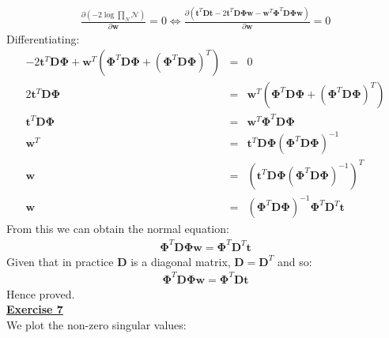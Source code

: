 \documentclass[a4paper, 11pt]{article}
\begin{document}
\begin{eqnarray}
\frac{\partial (-2 \log \prod_N \mathcal{N})}{\partial \mathbf{w}} = 0 \Leftrightarrow \frac{\partial \left( \mathbf{t}^T \mathbf{D} \mathbf{t} - 2 \mathbf{t}^T \mathbf{D} \mathbf{\Phi} \mathbf{w} - \mathbf{w}^T \mathbf{\Phi}^T \mathbf{D} \mathbf{\Phi} \mathbf{w} \right)}{\partial \mathbf{w}} = 0 \nonumber
\end{eqnarray}
Differentiating:
\begin{eqnarray}
-2 \mathbf{t}^T \mathbf{D} \mathbf{\Phi} + \mathbf{w}^T \left( \mathbf{\Phi}^T \mathbf{D} \mathbf{\Phi} + \left( \mathbf{\Phi}^T \mathbf{D} \mathbf{\Phi} \right)^T \right) &=& 0 \nonumber \\
2 \mathbf{t}^T \mathbf{D} \mathbf{\Phi} &=& \mathbf{w}^T \left( \mathbf{\Phi}^T \mathbf{D} \mathbf{\Phi} + \left( \mathbf{\Phi}^T \mathbf{D} \mathbf{\Phi} \right)^T \right) \nonumber \\
\mathbf{t}^T \mathbf{D} \mathbf{\Phi} &=& \mathbf{w}^T \mathbf{\Phi}^T \mathbf{D} \mathbf{\Phi} \nonumber \\
\mathbf{w}^T &=& \mathbf{t}^T \mathbf{D} \mathbf{\Phi} \left( \mathbf{\Phi}^T \mathbf{D} \mathbf{\Phi} \right)^{-1} \nonumber \\
\mathbf{w} &=& \left( \mathbf{t}^T \mathbf{D} \mathbf{\Phi} \left( \mathbf{\Phi}^T \mathbf{D} \mathbf{\Phi} \right)^{-1} \right)^T \nonumber \\
\mathbf{w} &=& \left( \mathbf{\Phi}^T \mathbf{D} \mathbf{\Phi} \right)^{-1} \mathbf{\Phi}^T \mathbf{D}^T \mathbf{t} \nonumber
\end{eqnarray}
From this we can obtain the normal equation:
\begin{eqnarray}
\mathbf{\Phi}^T \mathbf{D} \mathbf{\Phi} \mathbf{w} = \mathbf{\Phi}^T \mathbf{D}^T \mathbf{t} \nonumber
\end{eqnarray}
Given that in practice $\mathbf{D}$ is a diagonal matrix, $\mathbf{D} = \mathbf{D}^T$ and so:
\begin{eqnarray}
\mathbf{\Phi}^T \mathbf{D} \mathbf{\Phi} \mathbf{w} = \mathbf{\Phi}^T \mathbf{D} \mathbf{t} \nonumber
\end{eqnarray}
Hence proved.\\
\newpage
\textbf{\underline{Exercise 7}}\\
\newline We plot the non-zero singular values:\\
\end{document}
